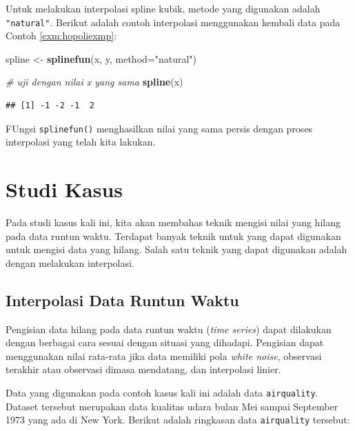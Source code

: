 \documentclass[]{book}
\newenvironment{Shaded}{\begin{snugshade}}{\end{snugshade}}
\newcommand{\CommentTok}[1]{\textcolor[rgb]{0.56,0.35,0.01}{\textit{#1}}}
\newcommand{\DataTypeTok}[1]{\textcolor[rgb]{0.13,0.29,0.53}{#1}}
\newcommand{\KeywordTok}[1]{\textcolor[rgb]{0.13,0.29,0.53}{\textbf{#1}}}
\newcommand{\NormalTok}[1]{#1}
\newcommand{\StringTok}[1]{\textcolor[rgb]{0.31,0.60,0.02}{#1}}
\theoremstyle{definition}
\theoremstyle{definition}
\theoremstyle{definition}
\theoremstyle{remark}
\begin{document}
Untuk melakukan interpolasi spline kubik, metode yang digunakan adalah \texttt{"natural"}. Berikut adalah contoh interpolasi menggunakan kembali data pada Contoh \ref{exm:hopoliexmp}:

\begin{Shaded}
\begin{Highlighting}[]
\NormalTok{spline <-}\StringTok{ }\KeywordTok{splinefun}\NormalTok{(x, y, }\DataTypeTok{method=}\StringTok{"natural"}\NormalTok{)}

\CommentTok{# uji dengan nilai x yang sama}
\KeywordTok{spline}\NormalTok{(x)}
\end{Highlighting}
\end{Shaded}

\begin{verbatim}
## [1] -1 -2 -1  2
\end{verbatim}

FUngsi \texttt{splinefun()} menghasilkan nilai yang sama persis dengan proses interpolasi yang telah kita lakukan.

\hypertarget{studi-kasus-1}{%
\section{Studi Kasus}\label{studi-kasus-1}}

Pada studi kasus kali ini, kita akan membahas teknik mengisi nilai yang hilang pada data runtun waktu. Terdapat banyak teknik untuk yang dapat digunakan untuk mengisi data yang hilang. Salah satu teknik yang dapat digunakan adalah dengan melakukan interpolasi.

\hypertarget{interpolasi-data-runtun-waktu}{%
\subsection{Interpolasi Data Runtun Waktu}\label{interpolasi-data-runtun-waktu}}

Pengisian data hilang pada data runtun waktu (\emph{time series}) dapat dilakukan dengan berbagai cara sesuai dengan situasi yang dihadapi. Pengisian dapat menggunakan nilai rata-rata jika data memiliki pola \emph{white noise}, observasi terakhir atau observasi dimasa mendatang, dan interpolasi linier.

Data yang digunakan pada contoh kasus kali ini adalah data \texttt{airquality}. Dataset tersebut merupakan data kualitas udara bulan Mei sampai September 1973 yang ada di New York. Berikut adalah ringkasan data \texttt{airquality} tersebut:
\end{document}
